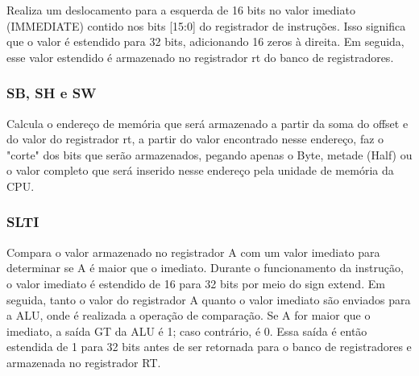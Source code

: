 Realiza um deslocamento para a esquerda de 16 bits no valor imediato (IMMEDIATE) contido nos bits [15:0] do registrador de instruções. Isso significa que o valor é estendido para 32 bits, adicionando 16 zeros à direita. Em seguida, esse valor estendido é armazenado no registrador rt do banco de registradores.

\subsubsection{SB, SH e SW}

Calcula o endereço de memória que será armazenado a partir da soma do offset e do valor do registrador rt, a partir do valor encontrado nesse endereço, faz o "corte" dos bits que serão armazenados, pegando apenas o Byte, metade (Half) ou o valor completo que será inserido nesse endereço pela unidade de memória da CPU.


\subsubsection{SLTI}

Compara o valor armazenado no registrador A com um valor imediato para determinar se A é maior que o imediato. Durante o funcionamento da instrução, o valor imediato é estendido de 16 para 32 bits por meio do sign extend. Em seguida, tanto o valor do registrador A quanto o valor imediato são enviados para a ALU, onde é realizada a operação de comparação. Se A for maior que o imediato, a saída GT da ALU é 1; caso contrário, é 0. Essa saída é então estendida de 1 para 32 bits antes de ser retornada para o banco de registradores e armazenada no registrador RT.

